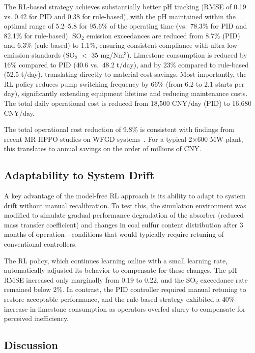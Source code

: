 \documentclass[journal]{IEEEtran}
\begin{document}
The RL-based strategy achieves substantially better pH tracking (RMSE of 0.19 vs. 0.42 for PID and 0.38 for rule-based), with the pH maintained within the optimal range of 5.2--5.8 for 95.6\% of the operating time (vs.\ 78.3\% for PID and 82.1\% for rule-based). SO$_2$ emission exceedances are reduced from 8.7\% (PID) and 6.3\% (rule-based) to 1.1\%, ensuring consistent compliance with ultra-low emission standards (SO$_2$ $<$ 35 mg/Nm$^3$). Limestone consumption is reduced by 16\% compared to PID (40.6 vs.\ 48.2 t/day), and by 23\% compared to rule-based (52.5 t/day), translating directly to material cost savings. Most importantly, the RL policy reduces pump switching frequency by 66\% (from 6.2 to 2.1 starts per day), significantly extending equipment lifetime and reducing maintenance costs. The total daily operational cost is reduced from 18,500 CNY/day (PID) to 16,680 CNY/day.

The total operational cost reduction of 9.8\% is consistent with findings from recent MR-HPPO studies on WFGD systems~\cite{mr2026}. For a typical 2×600 MW plant, this translates to annual savings on the order of millions of CNY.

\subsection{Adaptability to System Drift}

A key advantage of the model-free RL approach is its ability to adapt to system drift without manual recalibration. To test this, the simulation environment was modified to simulate gradual performance degradation of the absorber (reduced mass transfer coefficient) and changes in coal sulfur content distribution after 3 months of operation---conditions that would typically require retuning of conventional controllers.

The RL policy, which continues learning online with a small learning rate, automatically adjusted its behavior to compensate for these changes. The pH RMSE increased only marginally from 0.19 to 0.22, and the SO$_2$ exceedance rate remained below 2\%. In contrast, the PID controller required manual retuning to restore acceptable performance, and the rule-based strategy exhibited a 40\% increase in limestone consumption as operators overfed slurry to compensate for perceived inefficiency.

\subsection{Discussion}
\end{document}
